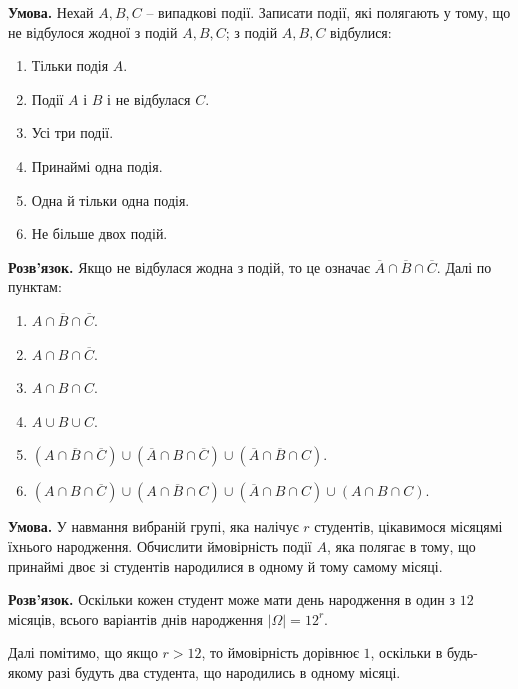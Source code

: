 \documentclass[oneside,solution]{karazin-prob-theory-assign}
\begin{document}

\hspace{20px}\textbf{Умова.} Нехай $A,B,C$ -- випадкові події. Записати події, які полягають у тому, що не відбулося жодної з подій $A,B,C$; з подій $A,B,C$ відбулися:
\begin{enumerate}
    \item Тільки подія $A$.
    \item Події $A$ і $B$ і не відбулася $C$.
    \item Усі три події.
    \item Принаймі одна подія.
    \item Одна й тільки одна подія.
    \item Не більше двох подій.
\end{enumerate}
\textbf{Розв'язок.} Якщо не відбулася жодна з подій, то це означає $\overline{A} \cap \overline{B} \cap \overline{C}$. Далі по пунктам:
\begin{enumerate}
    \item $A \cap \overline{B} \cap \overline{C}$.
    \item $A \cap B \cap \overline{C}$.
    \item $A \cap B \cap C$.
    \item $A \cup B \cup C$.
    \item $(A \cap \overline{B} \cap \overline{C}) \cup (\overline{A} \cap B \cap \overline{C}) \cup (\overline{A} \cap \overline{B} \cap C)$.
    \item $(A \cap B \cap \overline{C}) \cup (A \cap \overline{B} \cap C) \cup (\overline{A} \cap B \cap C) \cup (A \cap B \cap C)$.
\end{enumerate}


\hspace{20px}\textbf{Умова.} У навмання вибраній групі, яка налічує $r$ студентів, цікавимося місяцямі їхнього народження. Обчислити ймовірність події $A$, яка полягає в тому, що принаймі двоє зі студентів народилися в одному й тому самому місяці.

\textbf{Розв'язок.} Оскільки кожен студент може мати день народження в один з $12$ місяців, всього варіантів днів народження $|\Omega|=12^r$. 

Далі помітимо, що якщо $r > 12$, то ймовірність дорівнює $1$, оскільки в будь-якому разі будуть два студента, що народились в одному місяці. 
\end{document}
